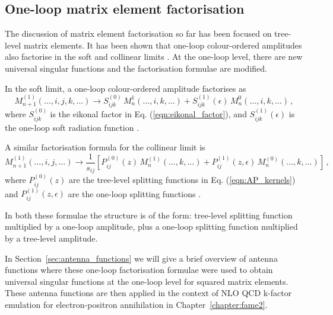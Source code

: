 \documentclass[main.tex]{subfiles}
\begin{document}
\subsection{One-loop matrix element factorisation}\label{sec:OL_factorisation}
    The discussion of matrix element factorisation so
    far has been focused on tree-level matrix elements.
    It has been shown that one-loop colour-ordered amplitudes
    also factorise in the soft and collinear limits \cite{Bern:1994zx,Bern:1995ix,Bern:1998sc,Kosower:1999xi}.
    At the one-loop level, there are new universal singular
    functions and the factorisation formulae are modified.

    In the soft limit, a one-loop colour-ordered amplitude
    factorises as
    \begin{equation}\label{eqn:1L_soft_factorisation}
        M_{n+1}^{(1)}(\ldots, i, j, k, \ldots) \rightarrow S_{ijk}^{(0)} \, M_{n}^{1}(\ldots, i, k, \ldots) + S_{ijk}^{(1)}(\epsilon) \, M_{n}^{0}(\ldots, i, k, \ldots) \, ,
    \end{equation}
    where $S_{ijk}^{(0)}$ is the eikonal factor in Eq. (\ref{eqn:eikonal_factor}),
    and $S_{ijk}^{(1)}(\epsilon)$ is the one-loop soft radiation function \cite{Bern:1999ry}.

    A similar factorisation formula for the collinear limit is
    \begin{equation}\label{eqn:1L_collinear_factorisation}
        M_{n+1}^{(1)}(\ldots, i, j, \ldots) \rightarrow \dfrac{1}{s_{ij}} \left[ P_{ij}^{(0)}(z) \, M_{n}^{(1)}(\ldots, k, \ldots) + P_{ij}^{(1)}(z, \epsilon) \, M_{n}^{(0)}(\ldots, k, \ldots) \right] \, ,
    \end{equation}
    where $P_{ij}^{(0)}(z)$ are the tree-level splitting functions
    in Eq. (\ref{eqn:AP_kernels}) and $P_{ij}^{(1)}(z, \epsilon)$
    are the one-loop splitting functions \cite{Bern:1999ry}.

    In both these formulae the structure is of the form:
    tree-level splitting function multiplied by a one-loop
    amplitude, plus a one-loop splitting function multiplied
    by a tree-level amplitude.

    In Section~\ref{sec:antenna_functions} we will give
    a brief overview of antenna functions where these one-loop
    factorisation formulae were used to obtain universal singular functions
    at the one-loop level for squared matrix elements. These
    antenna functions are then applied in the context of NLO QCD
    k-factor emulation for electron-positron annihilation in Chapter~\ref{chapter:fame2}.
\end{document}

